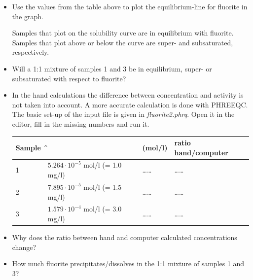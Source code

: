 \begin{itemize}
\item Use the values from the table above to plot the equilibrium-line for fluorite in the graph. 

Samples that plot on the solubility curve are in equilibrium with fluorite. Samples that plot above or below the curve are super- and subsaturated, respectively.

\item Will a 1:1 mixture of samples 1 and 3 be in equilibrium, super- or subsaturated with respect to fluorite?

\item In the hand calculations the difference between concentration and activity is not taken into account. A more accurate calculation is done with PHREEQC. The basic set-up of the input file is given in \textit{fluorite2.phrq}. Open it in the editor, fill in the missing numbers and run it.

\begin{table}[h]
\centering
\footnotesize
\begin{tabular}{llll}
\toprule
Sample	& \f & \ca (mol/l) & ratio hand/computer \\
\midrule
1 & $5.264 \cdot 10^{-5}$ mol/l (= 1.0 mg/l) & \ldots\ldots & \ldots\ldots \\
2	& $7.895 \cdot 10^{-5}$ mol/l (= 1.5 mg/l) & \ldots\ldots & \ldots\ldots \\
3	& $1.579 \cdot 10^{-4}$ mol/l (= 3.0 mg/l) & \ldots\ldots & \ldots\ldots \\
\bottomrule
\end{tabular}
\end{table}

\item Why does the ratio between hand and computer calculated concentrations change?

\item How much fluorite precipitates/dissolves in the 1:1 mixture of samples 1 and 3?

\end{itemize}
